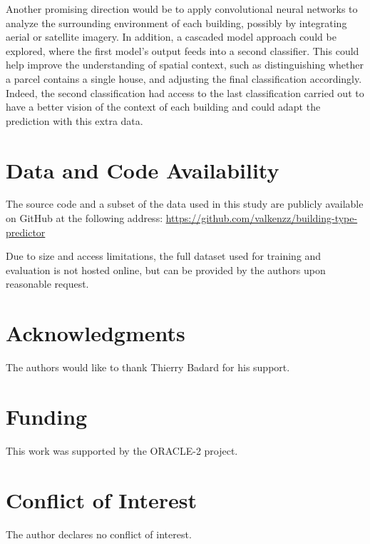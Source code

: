 \documentclass[11pt]{article}
\begin{document}
Another promising direction would be to apply convolutional neural networks to analyze the surrounding environment of each building, possibly by integrating aerial or satellite imagery. In addition, a cascaded model approach could be explored, where the first model’s output feeds into a second classifier. This could help improve the understanding of spatial context, such as distinguishing whether a parcel contains a single house, and adjusting the final classification accordingly. Indeed, the second classification had access to the last classification carried out to have a better vision of the context of each building and could adapt the prediction with this extra data.















\section*{Data and Code Availability}

The source code and a subset of the data used in this study are publicly available on GitHub at the following address:  
\url{https://github.com/valkenzz/building-type-predictor}

Due to size and access limitations, the full dataset used for training and evaluation is not hosted online, but can be provided by the authors upon reasonable request.


\section*{Acknowledgments}
The authors would like to thank Thierry Badard for his support.

\section*{Funding}
This work was supported by the ORACLE-2 project.

\section*{Conflict of Interest}
The author declares no conflict of interest.




\end{document}
